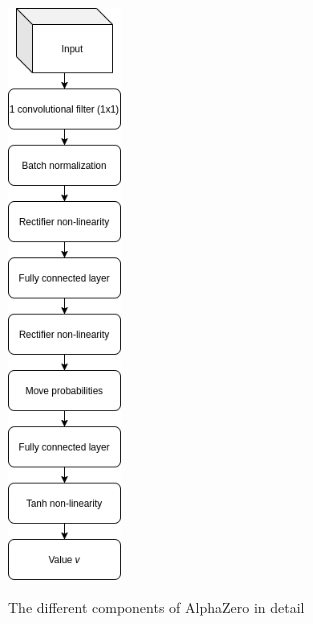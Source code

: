 \documentclass{../lib/llncs}
\begin{document}
\begin{adjustwidth}{-5in}{-5in}
\begin{figure}[!h]
{      \includegraphics[width=3cm, keepaspectratio]{alphazero_architecture_value_head.png}
    }
    \caption{The different components of AlphaZero in detail \cite{silver_mastering_2017}}
    \label{alphazero_architecture_details}
  \end{figure}
\end{adjustwidth}
\newpage


\end{document}
